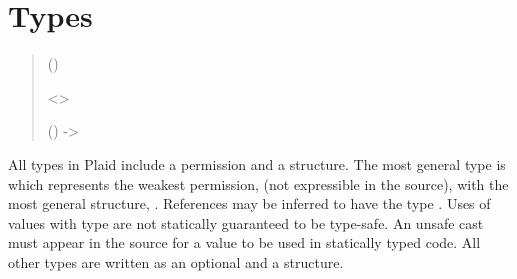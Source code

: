 \section{Types}

\begin{quote}


 {}

 {} 

 {} 

 ()


 {}

 {}

 {}


 {} <>

 {}


 {} 


 {} ()  -> 


 {}

 {} 


{ {} }
\end{quote}

All types in Plaid include a permission and a structure.  The most general
type is  which represents the weakest
permission,  (not expressible in the source), with the most 
general structure, . References may be inferred to have the
type .  Uses of values with type  are not statically
guaranteed to be type-safe.  An unsafe cast must appear in the source
for a  value to be used in statically typed code. 
All other types are written as an optional  and a structure.

